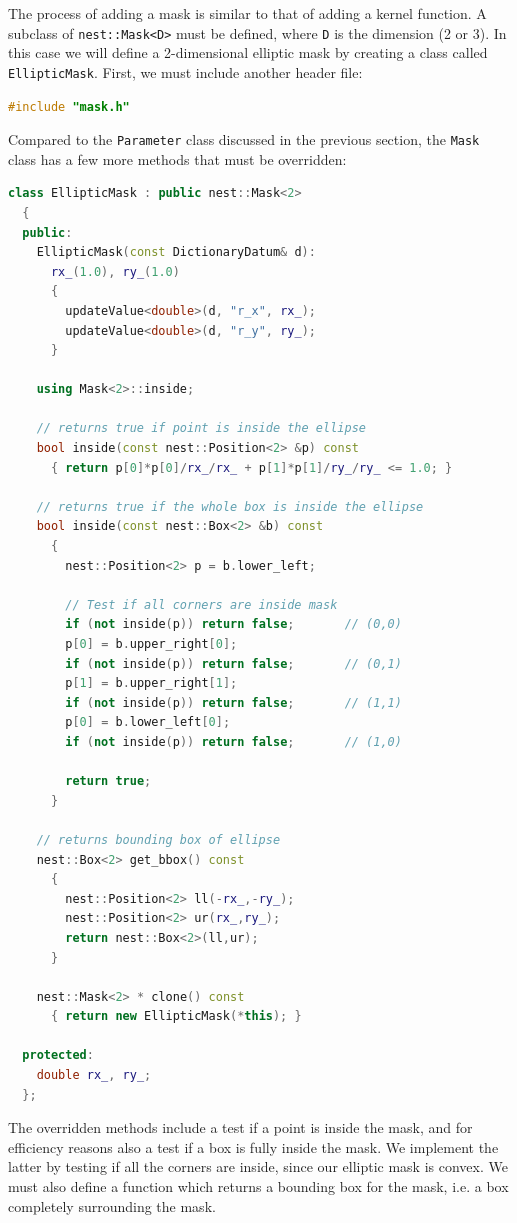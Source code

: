 \documentclass[a4paper,12pt]{report}
\begin{document}
The process of adding a mask is similar to that of adding a kernel
function. A subclass of \lstinline!nest::Mask<D>! must be defined, where
\lstinline!D! is the dimension (2 or 3). In this case we will define a
2-dimensional elliptic mask by creating a class called
\lstinline!EllipticMask!. First, we must include another header file:
\begin{lstlisting}[language=C++]
#include "mask.h"
\end{lstlisting}
Compared to the \lstinline!Parameter! class discussed in the previous
section, the \lstinline!Mask! class has a few more methods that must be
overridden:
\begin{lstlisting}[language=C++]
  class EllipticMask : public nest::Mask<2>
  {
  public:
    EllipticMask(const DictionaryDatum& d):
      rx_(1.0), ry_(1.0)
      {
        updateValue<double>(d, "r_x", rx_);
        updateValue<double>(d, "r_y", ry_);
      }

    using Mask<2>::inside;

    // returns true if point is inside the ellipse
    bool inside(const nest::Position<2> &p) const
      { return p[0]*p[0]/rx_/rx_ + p[1]*p[1]/ry_/ry_ <= 1.0; }

    // returns true if the whole box is inside the ellipse
    bool inside(const nest::Box<2> &b) const
      {
        nest::Position<2> p = b.lower_left;

        // Test if all corners are inside mask
        if (not inside(p)) return false;       // (0,0)
        p[0] = b.upper_right[0];
        if (not inside(p)) return false;       // (0,1)
        p[1] = b.upper_right[1];
        if (not inside(p)) return false;       // (1,1)
        p[0] = b.lower_left[0];
        if (not inside(p)) return false;       // (1,0)

        return true;
      }

    // returns bounding box of ellipse
    nest::Box<2> get_bbox() const
      {
        nest::Position<2> ll(-rx_,-ry_);
        nest::Position<2> ur(rx_,ry_);
        return nest::Box<2>(ll,ur);
      }

    nest::Mask<2> * clone() const
      { return new EllipticMask(*this); }

  protected:
    double rx_, ry_;
  };
\end{lstlisting}
The overridden methods include a test if a point is inside the mask, and
for efficiency reasons also a test if a box is fully inside the mask. We
implement the latter by testing if all the corners are inside, since our
elliptic mask is convex. We must also define a function which returns a
bounding box for the mask, i.e. a box completely surrounding the mask.
\end{document}
